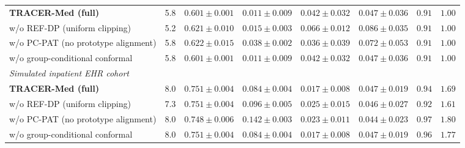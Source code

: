 \documentclass[3p,12pt]{elsarticle}
\theoremstyle{plain}
\theoremstyle{definition}
\begin{document}
\begin{table}[t]
{\begin{tabular}{lccccccc}
\textbf{TRACER-Med (full)} & 5.8 & $0.601 \pm 0.001$ & $\mathbf{0.011} \pm \mathbf{0.009}$ & $0.042 \pm 0.032$ & $\mathbf{0.047} \pm \mathbf{0.036}$ & $0.91$ & $1.00$ \\
\quad w/o REF-DP (uniform clipping) & 5.2 & $0.621 \pm 0.010$ & $0.015 \pm 0.003$ & $0.066 \pm 0.012$ & $0.086 \pm 0.035$ & $0.91$ & $1.00$ \\
\quad w/o PC-PAT (no prototype alignment) & 5.8 & $\mathbf{0.622} \pm \mathbf{0.015}$ & $0.038 \pm 0.002$ & $\mathbf{0.036} \pm \mathbf{0.039}$ & $0.072 \pm 0.053$ & $0.91$ & $1.00$ \\
\quad w/o group-conditional conformal & 5.8 & $0.601 \pm 0.001$ & $\mathbf{0.011} \pm \mathbf{0.009}$ & $0.042 \pm 0.032$ & $\mathbf{0.047} \pm \mathbf{0.036}$ & $0.91$ & $1.00$ \\
\midrule
\multicolumn{8}{l}{\emph{Simulated inpatient EHR cohort}} \\
\textbf{TRACER-Med (full)} & 8.0 & $\mathbf{0.751} \pm \mathbf{0.004}$ & $\mathbf{0.084} \pm \mathbf{0.004}$ & $\mathbf{0.017} \pm \mathbf{0.008}$ & $0.047 \pm 0.019$ & $0.94$ & $1.69$ \\
\quad w/o REF-DP (uniform clipping) & 7.3 & $0.751 \pm 0.004$ & $0.096 \pm 0.005$ & $0.025 \pm 0.015$ & $0.046 \pm 0.027$ & $0.92$ & $1.61$ \\
\quad w/o PC-PAT (no prototype alignment) & 8.0 & $0.748 \pm 0.006$ & $0.142 \pm 0.003$ & $0.023 \pm 0.011$ & $\mathbf{0.044} \pm \mathbf{0.023}$ & $0.97$ & $1.80$ \\
\quad w/o group-conditional conformal & 8.0 & $\mathbf{0.751} \pm \mathbf{0.004}$ & $\mathbf{0.084} \pm \mathbf{0.004}$ & $\mathbf{0.017} \pm \mathbf{0.008}$ & $0.047 \pm 0.019$ & $0.96$ & $1.77$ \\
\bottomrule
\end{tabular}
}
\end{table}
\end{document}
